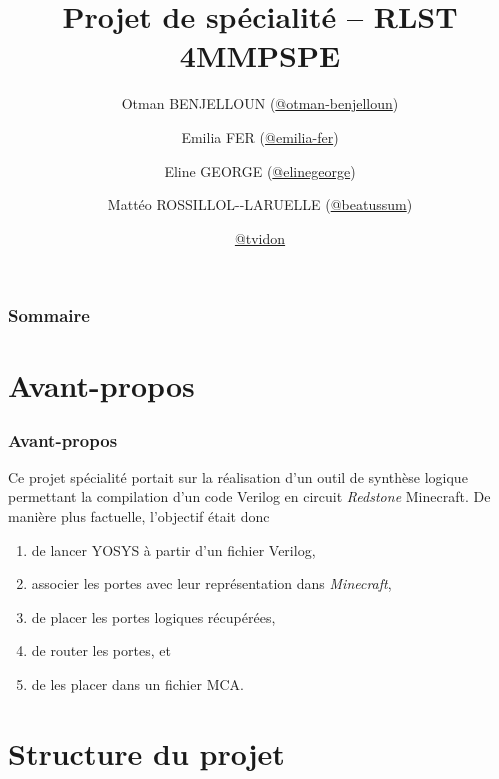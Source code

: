 \documentclass[aspectratio = 1610, french]{beamer}
\author[]{
    Otman BENJELLOUN (\href{https://github.com/otman-benjelloun/}{@otman-benjelloun}) \and
    Emilia FER (\href{https://github.com/emilia-fer/}{@emilia-fer}) \and
    Eline GEORGE (\href{https://github.com/elinegeorge/}{@elinegeorge}) \and
    Mattéo ROSSILLOL-{}-LARUELLE (\href{https://github.com/beatussum/}{@beatussum}) \and
    \href{https://github.com/tvidon/}{@tvidon}
}
\title[4MMPSPE -- RLST]{
    Projet de spécialité -- RLST \\
    \small{4MMPSPE}
}
\begin{document}
\frame{\titlepage}

\begin{frame}

\frametitle{Sommaire}

\end{frame}

\section{Avant-propos}

\begin{frame}

\frametitle{Avant-propos}

Ce projet spécialité portait sur la réalisation d'un outil de synthèse logique permettant la compilation d'un code Verilog en circuit \emph{Redstone} Minecraft. De manière plus factuelle, l'objectif était donc

\begin{enumerate}
    \item<+-> de lancer YOSYS à partir d'un fichier Verilog,
    \item<+-> associer les portes avec leur représentation dans \emph{Minecraft},
    \item<+-> de placer les portes logiques récupérées,
    \item<+-> de router les portes, et
    \item<+-> de les placer dans un fichier MCA.
\end{enumerate}

\end{frame}

\section{Structure du projet}
\end{document}
